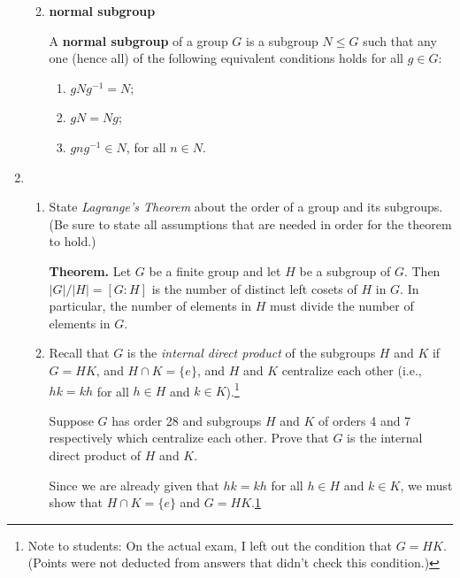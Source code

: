 \documentclass[fleqn,12pt]{article}
\newcommand{\<}{\ensuremath{\langle}}
\renewcommand{\>}{\ensuremath{\rangle}}
\begin{document}
\begin{enumerate}[{\bf 1.}]
\begin{enumerate}
    \bigskip

  \item {\bf normal subgroup}
    \medskip

    A {\bf normal subgroup} of a group $G$ is a subgroup $N\leq G$ such that
    any one (hence all) of the following equivalent conditions holds for all $g\in G$:
    \begin{enumerate}
    \item $g N g^{-1} = N$;
    \item $g N = Ng$;
    \item $g n g^{-1} \in N$, for all $n\in N$.
    \end{enumerate}

    \bigskip


  \end{enumerate}

\newpage

\item
  \begin{enumerate}
  \item State \emph{Lagrange's Theorem} about the order of a group and its
    subgroups. (Be sure to state all assumptions that are needed in order for
    the theorem to hold.)  

    \medskip

    {\bf Theorem.} Let $G$ be a finite group and let $H$ be a subgroup
    of $G$. Then $|G|/|H| = [G : H]$ is the number of distinct left cosets of $H$ in
    $G$. In particular, the number of elements in $H$ must divide the number of
    elements in $G$.

    \bigskip

    \item Recall that $G$ is the \emph{internal direct product} of the subgroups
      $H$ and $K$ if $G = HK$, and $H\cap K= \{e\}$, and $H$ and $K$ centralize
      each other (i.e., $hk = kh$ for all $h\in H$ and $k\in
      K$).\footnote{\label{note1}Note to students: On the actual exam, I left
        out the condition that $G = HK$. (Points were not deducted from
        answers that didn't check this condition.)}

\medskip

      Suppose $G$ has order 28 and subgroups $H$ and $K$ of orders 4
      and 7 respectively which centralize each other.  Prove that
      $G$ is the internal direct product of $H$ and $K$.

      \medskip

      Since we are already given that $hk = kh$ for all $h\in H$ and $k\in K$, we 
      must show that $H\cap K= \{e\}$ and $G = HK$.\cref{note1}


\end{enumerate}
\end{enumerate}
\end{document}

